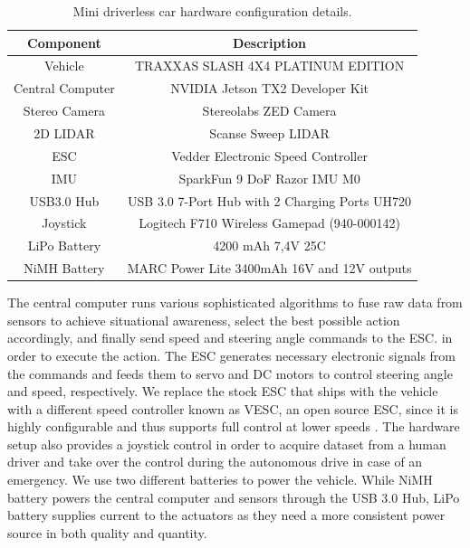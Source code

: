 \begin{table}[h]
  \begin{center}
    \caption{Mini driverless car hardware configuration details.}
    \label{table:hardware-configuration}
    \begin{tabular}{|c|c|}
      \hline
      \textbf{Component} & \textbf{Description} \\
      \hline
      Vehicle            & TRAXXAS SLASH 4X4 PLATINUM EDITION \\ 
      \hline
      Central Computer   & NVIDIA Jetson TX2 Developer Kit \\
      \hline
      Stereo Camera      & Stereolabs ZED Camera \\
      \hline
      2D LIDAR           & Scanse Sweep LIDAR \\
      \hline
      ESC                & Vedder Electronic Speed Controller \\
      \hline
      IMU                & SparkFun 9 DoF Razor IMU M0 \\
      \hline
      USB3.0 Hub         & USB 3.0 7-Port Hub with 2 Charging Ports UH720 \\
      \hline
      Joystick           & Logitech F710 Wireless Gamepad (940-000142) \\
      \hline
      LiPo Battery       & 4200 mAh 7,4V 25C \\
      \hline
      NiMH Battery       & MARC Power Lite 3400mAh 16V and 12V outputs \\
      \hline
    \end{tabular}
  \end{center}
\end{table}

The central computer runs various sophisticated algorithms to fuse raw data
from sensors to achieve situational awareness, select the best possible action
accordingly, and finally send speed and steering angle commands to the ESC.  in
order to execute the action. The ESC generates necessary electronic signals
from the commands and feeds them to servo and DC motors to control steering
angle and speed, respectively. We replace the stock ESC that ships with the
vehicle with a different speed controller known as VESC, an open source ESC,
since it is highly configurable and thus supports full control at lower speeds
\cite{Vesc2015ESC}. The hardware setup also provides a joystick control in
order to acquire dataset from a human driver and take over the control during
the autonomous drive in case of an emergency. We use two different batteries to
power the vehicle.  While NiMH battery powers the central computer and sensors
through the USB 3.0 Hub, LiPo battery supplies current to the actuators as they
need a more consistent power source in both quality and quantity.

